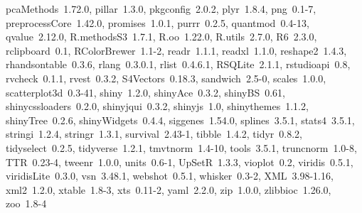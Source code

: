 \documentclass[12pt]{article}
\begin{document}
\begin{itemize}
    pcaMethods~1.72.0, pillar~1.3.0, pkgconfig~2.0.2, plyr~1.8.4, png~0.1-7, preprocessCore~1.42.0, promises~1.0.1,
    purrr~0.2.5, quantmod~0.4-13, qvalue~2.12.0, R.methodsS3~1.7.1, R.oo~1.22.0, R.utils~2.7.0, R6~2.3.0, rclipboard~0.1,
    RColorBrewer~1.1-2, readr~1.1.1, readxl~1.1.0, reshape2~1.4.3, rhandsontable~0.3.6, rlang~0.3.0.1, rlist~0.4.6.1,
    RSQLite~2.1.1, rstudioapi~0.8, rvcheck~0.1.1, rvest~0.3.2, S4Vectors~0.18.3, sandwich~2.5-0, scales~1.0.0,
    scatterplot3d~0.3-41, shiny~1.2.0, shinyAce~0.3.2, shinyBS~0.61, shinycssloaders~0.2.0, shinyjqui~0.3.2, shinyjs~1.0,
    shinythemes~1.1.2, shinyTree~0.2.6, shinyWidgets~0.4.4, siggenes~1.54.0, splines~3.5.1, stats4~3.5.1, stringi~1.2.4,
    stringr~1.3.1, survival~2.43-1, tibble~1.4.2, tidyr~0.8.2, tidyselect~0.2.5, tidyverse~1.2.1, tmvtnorm~1.4-10,
    tools~3.5.1, truncnorm~1.0-8, TTR~0.23-4, tweenr~1.0.0, units~0.6-1, UpSetR~1.3.3, vioplot~0.2, viridis~0.5.1,
    viridisLite~0.3.0, vsn~3.48.1, webshot~0.5.1, whisker~0.3-2, XML~3.98-1.16, xml2~1.2.0, xtable~1.8-3, xts~0.11-2,
    yaml~2.2.0, zip~1.0.0, zlibbioc~1.26.0, zoo~1.8-4
\end{itemize}
\end{document}
